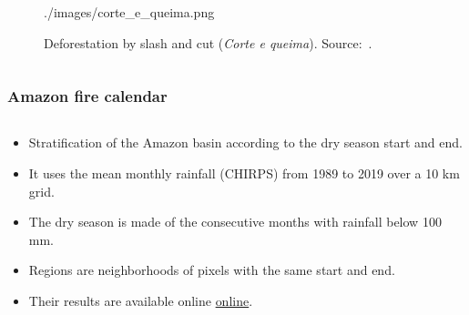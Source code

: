 \documentclass[aspectratio=169]{beamer}
\begin{document}
\begin{frame}
\begin{columns}
\begin{column}{0.5\linewidth}
\begin{figure}[h]
                {./images/corte_e_queima.png}
                \caption{Deforestation by slash and cut (\textit{Corte e queima}).
                Source:~\cite{dealmeida2022}.}
            \end{figure}
        \end{column}
    \end{columns}
\end{frame}

\begin{frame}
    \frametitle{Amazon fire calendar}
    \begin{columns}
        \begin{column}{0.5\linewidth}
            \begin{itemize}
                \item Stratification of the Amazon basin according to the dry
                    season start and \/end.
                \item It uses the mean monthly rainfall (CHIRPS) from 1989 to
                    2019 over a 10 km grid.
                \item The dry season is made of the consecutive months with 
                    rainfall below 100 mm.
                \item Regions are neighborhoods of pixels with the same start
                    and end.
                \item Their results are available online
                    \href{https://zenodo.org/records/5706455}{online}.
            \end{itemize}
        \end{column}
\end{columns}
\end{frame}
\end{document}
